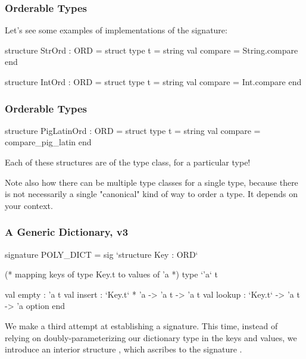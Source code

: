 \documentclass[aspectratio=169, handout]{beamer}
\begin{document}
\begin{frame}[fragile]
  \frametitle{Orderable Types}

  Let's see some examples of implementations of the  signature:

  \pause
  \begin{codeblock}
    structure StrOrd : ORD =
      struct
        type t = string
        val compare = String.compare
      end

    structure IntOrd : ORD =
      struct
        type t = string
        val compare = Int.compare
      end
  \end{codeblock}
\end{frame}

\begin{frame}[fragile]
  \frametitle{Orderable Types}

  \begin{codeblock}
    structure PigLatinOrd : ORD =
      struct
        type t = string
        val compare = compare_pig_latin
      end
  \end{codeblock}

  \pause
  \vspace{\fill}

  Each of these structures are  of the  type class,
  for a particular type!

  \pause
  \vspace{\fill}


  \pause
  \vspace{\fill}

  Note also how there can be multiple type classes for a single type, because there
  is not necessarily a single "canonical" kind of way to order a type. It depends
  on your context.
\end{frame}

\begin{frame}[fragile]
  \frametitle{A Generic Dictionary, v3}

  {\small
  \begin{codeblock}
    signature POLY_DICT =
      sig
        `structure Key : ORD`

        (* mapping keys of type Key.t to values of 'a *)
        type `'a` t

        val empty : 'a t
        val insert : `Key.t` * 'a -> 'a t -> 'a t
        val lookup : `Key.t` -> 'a t -> 'a option
      end
  \end{codeblock}
  }

  \pause
  \vspace{\fill}

  We make a third attempt at establishing a  signature.
  This time, instead of relying on doubly-parameterizing our dictionary
  type in the keys and values, we introduce an interior structure
  , which ascribes to the signature .
\end{frame}
\end{document}
